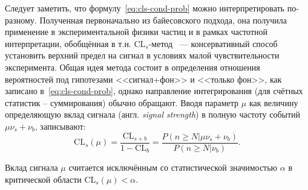 Следует заметить, что формулу~\eqref{eq:cls-cond-prob} можно
интерпретировать по-разному. Полученная первоначально из
байесовского подхода, она получила применение в
экспериментальной физики частиц и в рамках частотной
интерпретации, обобщённая в
т.н. $\text{CL}_s$-метод~\cite{cls-harel, read-cls} --- консервативный
способ установить верхний предел на сигнал в условиях малой
чувствительности эксперимента. Общая идея метода состоит в
определения отношения вероятностей под гипотезами <<сигнал+фон>>
и <<только фон>>, как записано в~\eqref{eq:cls-cond-prob},
однако направление интегрирования (для счётных статистик -- суммирования)
обычно обращают. Вводя параметр $\mu$ как величину определяющую вклад сигнала
(англ. \emph{signal strength}) в полную частоту
событий $\mu \nu_s + \nu_b$, записывают:
\begin{equation}
    \text{CL}_s (\mu) = \frac{\text{CL}_{s+b}}{1 - \text{CL}_b} = \frac{P(n \ge N | \mu\nu_s + \nu_b)}{P(n \ge N | \nu_b)}.
    \label{eq:cls-definition}
\end{equation}


Вклад сигнала $\mu$ считается исключённым со статистической
значимостью $\alpha$ в критической области $\text{CL}_s(\mu) < \alpha$.




